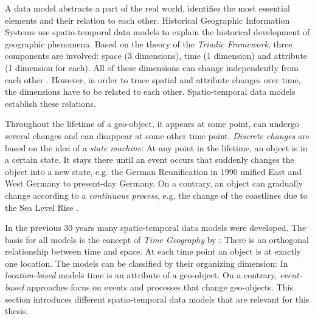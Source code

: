 A data model abstracts a part of the real world, identifies the most essential elements and their relation to each other. Historical Geographic Information Systems use spatio-temporal data models to explain the historical development of geographic phenomena. Based on the theory of the \emph{Triadic Framework}, three components are involved: space (3 dimensions), time (1 dimension) and attribute (1 dimension for each). All of these dimensions can change independently from each other
\cite[p. 53]{ott2001time}.
However, in order to trace spatial and attribute changes over time, the dimensions have to be related to each other. Spatio-temporal data models establish these relations.

Throughout the lifetime of a geo-object, it appears at some point, can undergo several changes and can disappear at some other time point. \emph{Discrete changes} are based on the idea of a \emph{state machine}: At any point in the lifetime, an object is in a certain state. It stays there until an event occurs that suddenly changes the object into a new state, e.g. the German Reunification in 1990 unified East and West Germany to present-day Germany. On a contrary, an object can gradually change according to a \emph{continuous process}, e.g. the change of the coastlines due to the Sea Level Rise
\cite{peuquet99}.

In the previous 30 years many spatio-temporal data models were developed. The basis for all models is the concept of \emph{Time Geography} by
\cite{haegerstrand1970}:
There is an orthogonal relationship between time and space. At each time point an object is at exactly one location. The models can be classified by their organizing dimension: In \emph{location-based} models time is an attribute of a geo-object. On a contrary, \emph{event-based} approaches focus on events and processes that change geo-objects. This section introduces different spatio-temporal data models that are relevant for this thesis.



